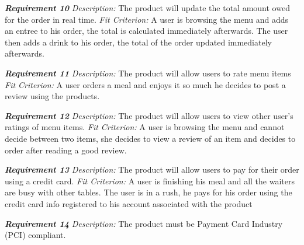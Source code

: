 \documentclass[12pt, titlepage]{article}
\begin{document}
\textbf{\textit{Requirement 10}}\newline
\textit{Description:}\newline
The product will update the total amount owed for the order in real time. \newline\newline
\textit{Fit Criterion:}\newline 
A user is browsing the menu and adds an entree to his order, the total is calculated immediately afterwards. The user then adds a drink to his order, the total of the order updated immediately afterwards.
\newline

\textbf{\textit{Requirement 11}}\newline
\textit{Description:}\newline
The product will allow users to rate menu items \newline\newline
\textit{Fit Criterion:}\newline 
A user orders a meal and enjoys it so much he decides to post a review using the products.
\newline

\textbf{\textit{Requirement 12}}\newline
\textit{Description:}\newline
The product will allow users to view other user's ratings of menu items. \newline\newline
\textit{Fit Criterion:}\newline 
A user is browsing the menu and cannot decide between two items, she decides to view a review of an item and decides to order after reading a good review.
\newline

\textbf{\textit{Requirement 13}}\newline
\textit{Description:}\newline
The product will allow users to pay for their order using a credit card. \newline\newline
\textit{Fit Criterion:}\newline 
A user is finishing his meal and all the waiters are busy with other tables. The user is in a rush, he pays for his order using the credit card info registered to his account associated with the product
\newline

\textbf{\textit{Requirement 14}}\newline
\textit{Description:}\newline
The product must be Payment Card Industry (PCI) compliant.
\newline
\end{document}
